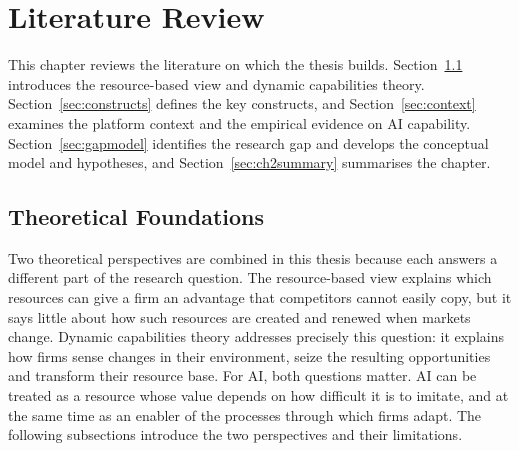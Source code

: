 %

\chapter{Literature Review}
\label{ch:litreview}

This chapter reviews the literature on which the thesis builds. Section~\ref{sec:theory} introduces the resource-based view and dynamic capabilities theory. Section~\ref{sec:constructs} defines the key constructs, and Section~\ref{sec:context} examines the platform context and the empirical evidence on AI capability. Section~\ref{sec:gapmodel} identifies the research gap and develops the conceptual model and hypotheses, and Section~\ref{sec:ch2summary} summarises the chapter.

\section{Theoretical Foundations}
\label{sec:theory}

Two theoretical perspectives are combined in this thesis because each answers a different part of the research question. The resource-based view explains which resources can give a firm an advantage that competitors cannot easily copy, but it says little about how such resources are created and renewed when markets change. Dynamic capabilities theory addresses precisely this question: it explains how firms sense changes in their environment, seize the resulting opportunities and transform their resource base. For AI, both questions matter. AI can be treated as a resource whose value depends on how difficult it is to imitate, and at the same time as an enabler of the processes through which firms adapt. The following subsections introduce the two perspectives and their limitations.

